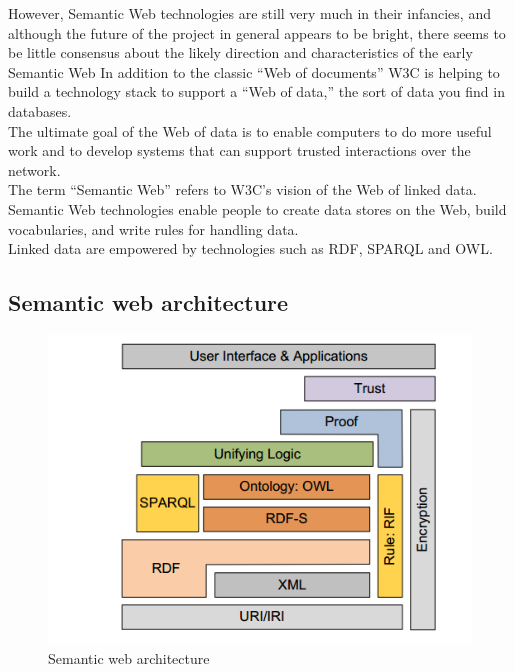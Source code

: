 \documentclass[a4paper,12pt,oneside]{report}
\begin{document}
{{However, Semantic Web technologies are still very much in their infancies, and although the future of the project in general appears to be bright, there seems to be little consensus about the likely direction and characteristics of the early Semantic Web
      In addition to the classic “Web of documents” W3C is helping to build a technology stack to support a “Web of data,” the sort of data you find in databases.\\
The ultimate goal of the Web of data is to enable computers to do more useful work and to develop systems that can support trusted interactions over the network.\\
 The term “Semantic Web” refers to W3C’s vision of the Web of linked data. Semantic Web technologies enable people to create data stores on the Web, build vocabularies, and write rules for handling data.\\
Linked data are empowered by technologies such as RDF, SPARQL and OWL.}
\subsection{Semantic web architecture}
\begin{figure}[ht]
\centering
\includegraphics[width=1\textwidth]{Capture0}
\caption{Semantic web architecture}
\end{figure}

}
\end{document}
